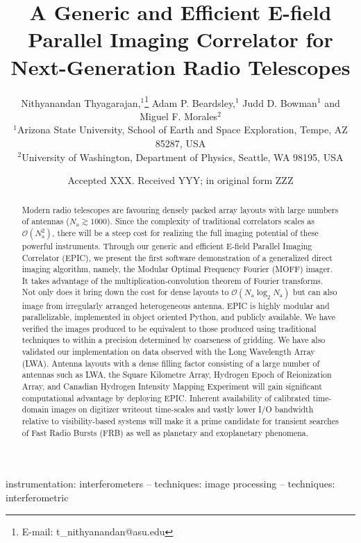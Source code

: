 \documentclass[a4paper,fleqn,usenatbib]{mnras}
\title[E-field Parallel Imaging Correlator]{A Generic and Efficient E-field Parallel Imaging Correlator for Next-Generation Radio Telescopes}
\author[Thyagarajan et al.]{
Nithyanandan Thyagarajan,$^{1}$\thanks{E-mail: t\_nithyanandan@asu.edu}
Adam P. Beardsley,$^{1}$
Judd D. Bowman$^{1}$
\newauthor
and Miguel F. Morales$^{2}$
\\
$^{1}$Arizona State University, School of Earth and Space Exploration, Tempe, AZ 85287, USA\\
$^{2}$University of Washington, Department of Physics, Seattle, WA 98195, USA\\
}
\date{Accepted XXX. Received YYY; in original form ZZZ}
\newcommand{\Nant}{N_\textrm{a}}
\begin{document}
\label{firstpage}
\pagerange{\pageref{firstpage}--\pageref{lastpage}}
\maketitle

\begin{abstract}
Modern radio telescopes are favouring densely packed array layouts with 
large numbers of antennas ($\Nant\gtrsim 1000$). Since the complexity of 
traditional correlators scales as $\mathcal{O}(\Nant^2)$, there will be a steep 
cost for realizing the full imaging potential of these powerful instruments. 
Through our generic and efficient E-field Parallel Imaging Correlator (EPIC), 
we present the first software demonstration of a generalized direct imaging 
algorithm, namely, the Modular Optimal Frequency Fourier (MOFF) imager. It takes 
advantage of the multiplication-convolution theorem of Fourier transforms. Not 
only does it bring down the cost for dense layouts to 
$\mathcal{O}(\Nant\log_2\Nant)$ but can also image from irregularly arranged 
heterogeneous antenna. EPIC is highly modular and parallelizable, implemented in 
object oriented Python, and publicly available. We have verified the images 
produced to be equivalent to those produced using traditional techniques to 
within a precision determined by coarseness of gridding. We have also validated 
our implementation on data observed with the Long Wavelength Array (LWA). Antenna 
layouts with a dense filling factor consisting of a large number of antennas such 
as LWA, the Square Kilometre Array, Hydrogen Epoch of Reionization Array, and 
Canadian Hydrogen Intensity Mapping Experiment will gain significant 
computational advantage by deploying EPIC. Inherent availability of calibrated 
time-domain images on digitizer writeout time-scales and vastly lower I/O 
bandwidth relative to visibility-based systems will make it a prime candidate 
for transient searches of Fast Radio Bursts (FRB) as well as planetary and 
exoplanetary phenomena. 
\end{abstract}

\begin{keywords}
instrumentation: interferometers -- techniques: image processing -- techniques: interferometric
\end{keywords}

\end{document}
